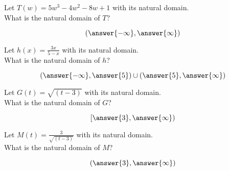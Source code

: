 \documentclass{ximera}
\author{Lee Wayand}
\begin{document}
\begin{exercise}








\begin{question}


Let $T(w) = 5 w^3 - 4 w^2 - 8w + 1$ with its natural domain. \\

What is the natural domain of $T$?

\[
\left( \answer{-\infty},  \answer{\infty}  \right)
\]


\end{question}







\begin{question}


Let $h(x) = \frac{3x}{5-x}$ with its natural domain. \\

What is the natural domain of $h$?

\[
\left( \answer{-\infty}, \answer{5}  \right) \cup \left( \answer{5}, \answer{\infty}  \right)
\]


\end{question}








\begin{question}


Let $G(t) = \sqrt{(t - 3)}$ with its natural domain. \\

What is the natural domain of $G$?

\[
\left[ \answer{3}, \answer{\infty}  \right)
\]


\end{question}








\begin{question}


Let $M(t) = \frac{3}{\sqrt{(t - 3)}}$ with its natural domain. \\

What is the natural domain of $M$?

\[
\left( \answer{3}, \answer{\infty}  \right)
\]


\end{question}













\end{exercise}
\end{document}
